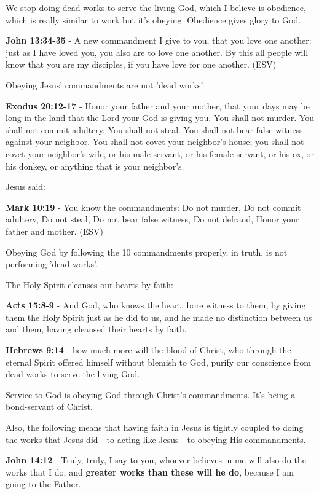 \documentclass[11pt]{article}
\begin{document}
We stop doing dead works to serve the living God, which I believe is obedience,
which is really similar to work but it's obeying. Obedience gives glory to God.

\textbf{John 13:34-35} - A new commandment I give to you, that you love one another: just as I have loved you, you also are to love one another. By this all people will know that you are my disciples, if you have love for one another. (ESV)

Obeying Jesus' commandments are not 'dead works'.

\textbf{Exodus 20:12-17} - Honor your father and your mother, that your days may be long in the land that the Lord your God is giving you. You shall not murder. You shall not commit adultery. You shall not steal. You shall not bear false witness against your neighbor. You shall not covet your neighbor's house; you shall not covet your neighbor's wife, or his male servant, or his female servant, or his ox, or his donkey, or anything that is your neighbor's.

Jesus said:

\textbf{Mark 10:19} - You know the commandments: Do not murder, Do not commit adultery, Do not steal, Do not bear false witness, Do not defraud, Honor your father and mother. (ESV)

Obeying God by following the 10 commandments properly, in truth, is not performing 'dead works'.

The Holy Spirit cleanses our hearts by faith:

\textbf{Acts 15:8-9} - And God, who knows the heart, bore witness to them, by giving them the Holy Spirit just as he did to us, and he made no distinction between us and them, having cleansed their hearts by faith.

\textbf{Hebrews 9:14} - how much more will the blood of Christ, who through the eternal Spirit offered himself without blemish to God, purify our conscience from dead works to serve the living God.

Service to God is obeying God through Christ's commandments. It's being a bond-servant of Christ.

Also, the following means that having faith in Jesus is tightly coupled to doing the works that Jesus did - to acting like Jesus - to obeying His commandments.

\textbf{John 14:12} - Truly, truly, I say to you, whoever believes in me will also do the works that I do; and \textbf{greater works than these will he do}, because I am going to the Father.
\end{document}
